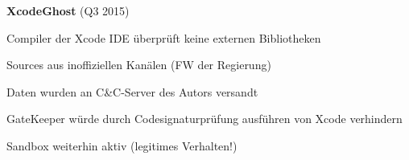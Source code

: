 \begin{frame}
	\centering
	\textbf{XcodeGhost} (Q3 2015)
	\begin{block}{}
		Compiler der Xcode IDE überprüft keine externen Bibliotheken
	\end{block}
	\begin{block}{}
		Sources aus inoffiziellen Kanälen (FW der Regierung)
	\end{block}
	\begin{block}{}
		Daten wurden an C\&C-Server des Autors versandt
	\end{block}
	\begin{block}{}
		GateKeeper würde durch Codesignaturprüfung ausführen von Xcode verhindern
	\end{block}
	\begin{block}{}
		Sandbox weiterhin aktiv (legitimes Verhalten!)
	\end{block}
\end{frame}